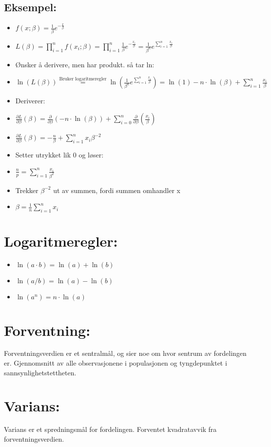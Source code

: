 \documentclass[12pt,a4paper,twocolumn,twoside]{article}
\def\parder#1#2#3{\frac{\partial #1}{\partial #2}\left( #3 \right)}
\begin{document}
\subsection*{Eksempel:}
\begin{itemize}[topsep=0pt,itemsep=0pt, partopsep=0pt]
    \item $f(x;\beta)=\frac{1}{\beta}e^{-\frac{x}{\beta}}$
    \item $L(\beta)=\prod_{i=1}^nf(x_i;\beta) = \prod_{i=1}^n\frac{1}{\beta}e^{-\frac{x_i}{\beta}}=\frac{1}{\beta^n}e^{\sum_{i=1}^n\frac{x_i}{\beta}}$
    \item Ønsker å derivere, men har produkt. så tar ln:
    \item $\ln(L(\beta))\stackrel{\text{Bruker logaritmeregler}}{=}\ln(\frac{1}{\beta^n}e^{\sum_{i=1}^n\frac{x_i}{\beta}}) = \ln(1)-n\cdot\ln(\beta)+\sum_{i=1}^n\frac{x_i}{\beta}$
    \item Deriverer:
    \item $\parder{L}{\beta}{\beta}=\parder{}{\beta}{-n\cdot\ln(\beta)}+\sum_{i=0}^n\parder{}{\beta}{\frac{x_i}{\beta}}$
    \item $\parder{L}{\beta}{\beta}=-\frac{n}{\beta}+\sum_{i=1}^n x_i\beta^{-2}$
    \item Setter utrykket lik 0 og løser:
    \item $\frac{n}{p}=\sum_{i=1}^n\frac{x_i}{\beta^2}$
    \item Trekker $\beta^{-2}$ ut av summen, fordi summen omhandler x
    \item $\beta=\frac{1}{n}\sum_{i=1}^nx_i$
\end{itemize}

\section*{Logaritmeregler:}
\begin{itemize}[topsep=0pt,itemsep=0pt, partopsep=0pt]
    \item $\ln(a\cdot b) = \ln(a)+\ln(b)$
    \item $\ln(a/b) = \ln(a)-\ln(b)$
    \item $\ln(a^n) = n\cdot\ln(a)$
\end{itemize}

%
%
\section*{Forventning:}
Forventningsverdien er et sentralmål, og sier noe om hvor sentrum av fordelingen er.
Gjennomsnitt av alle observasjonene i populasjonen og tyngdepunktet i sannsynlighetstettheten.
\section*{Varians:}
Varians er et spredningsmål for fordelingen. Forventet kvadratavvik fra forventningsverdien.
\end{document}
